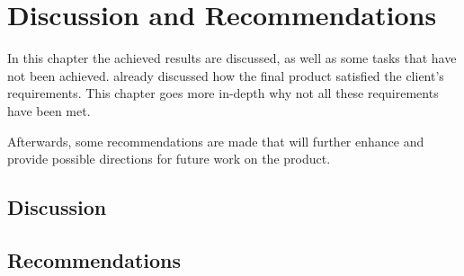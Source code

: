 \chapter{Discussion and Recommendations}
\label{cha:disc-recomm}

In this chapter the achieved results are discussed, as well as some tasks that
have not been achieved.  already discussed how the final
product satisfied the client's requirements. This chapter goes more in-depth why
not all these requirements have been met.

Afterwards, some recommendations are made that will further enhance and provide
possible directions for future work on the product.

\section{Discussion}
\label{sec:discuss-discussion}



\section{Recommendations}
\label{sec:discuss-future}





